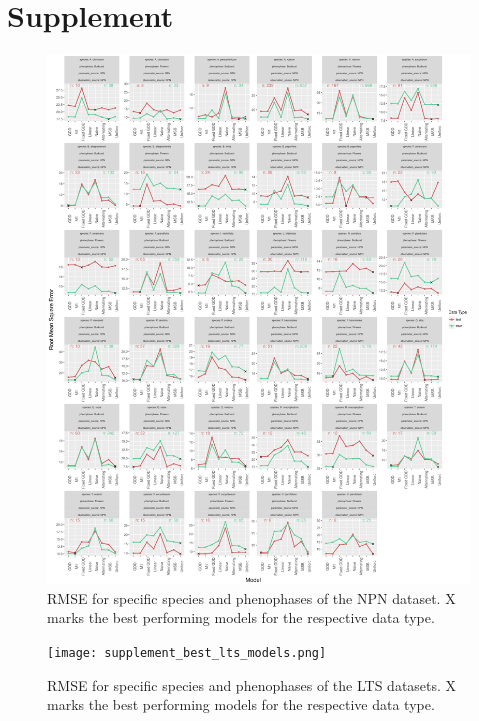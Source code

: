 \documentclass[fleqn,10pt,lineno]{wlpeerj} %
\begin{document}
\section*{Supplement}
\begin{figure}
	\centering
		\includegraphics[width=1\textwidth]{supplement_best_npn_models.png}
	\caption{RMSE for specific species and phenophases of the NPN dataset. X marks the best performing models for the respective data type.}
\end{figure}

\begin{figure}
	\centering
		\texttt{[image: supplement\_best\_lts\_models.png]}
	\caption{RMSE for specific species and phenophases of the LTS datasets. X marks the best performing models for the respective data type.}
\end{figure}
\end{document}

